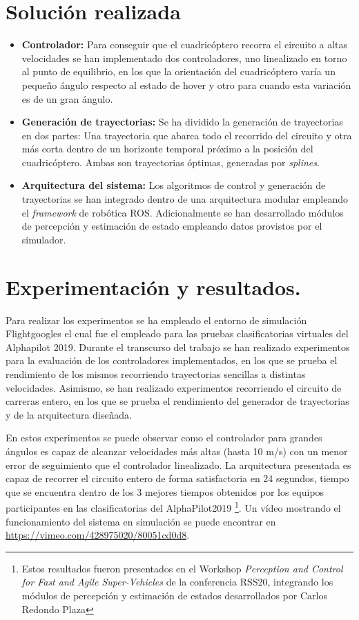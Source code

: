 \section*{Solución realizada}
\begin{itemize}
\item \textbf{Controlador:}
Para conseguir que el cuadricóptero recorra el circuito a altas velocidades se han implementado dos controladores, uno linealizado en torno al punto de equilibrio, en los que la orientación del cuadricóptero varía un pequeño ángulo respecto al estado de hover y otro para cuando esta variación es de un gran ángulo.

\item \textbf{Generación de trayectorias:} Se ha dividido la generación de trayectorias en dos partes:
Una trayectoria que abarca todo el recorrido del circuito y otra más corta dentro de un horizonte temporal próximo a la posición del cuadricóptero. Ambas son trayectorias óptimas, generadas por \textit{splines}.

\item \textbf{Arquitectura del sistema:} Los algoritmos de control y generación de trayectorias se han integrado dentro de una arquitectura modular empleando el \textit{framework} de robótica ROS. Adicionalmente se han desarrollado módulos de percepción y estimación de estado empleando datos provistos por el simulador.

\end{itemize}
	

\section*{Experimentación y resultados.}

Para realizar los experimentos se ha empleado el entorno de simulación Flightgoogles \cite{guerra2019flightgoggles}  el cual fue el empleado para las pruebas clasificatorias virtuales del Alphapilot 2019. Durante el transcurso del trabajo se han realizado experimentos para la evaluación de los controladores implementados, en los que se prueba el rendimiento de los mismos recorriendo trayectorias sencillas a distintas velocidades. Asimismo, se han realizado experimentos recorriendo el circuito de carreras entero, en los que se prueba el rendimiento del generador de trayectorias y de la arquitectura diseñada.

En estos experimentos se puede observar como el controlador para grandes ángulos es capaz de alcanzar velocidades más altas (hasta 10 m/s) con un menor error de seguimiento que el controlador linealizado. La arquitectura presentada es capaz de recorrer el circuito entero de forma satisfactoria en 24 segundos, tiempo que se encuentra dentro de los 3 mejores tiempos obtenidos por los equipos participantes en las clasificatorias del AlphaPilot2019 \cite{guerra2019flightgoggles} \footnote{Estos resultados fueron presentados en el Workshop  \textit{Perception and Control for Fast and Agile Super-Vehicles} de la conferencia RSS20, integrando los módulos de percepción y estimación de estados desarrollados por Carlos Redondo Plaza}. Un vídeo mostrando el funcionamiento del sistema en simulación se puede encontrar en \url{https://vimeo.com/428975020/80051cd0d8}.


